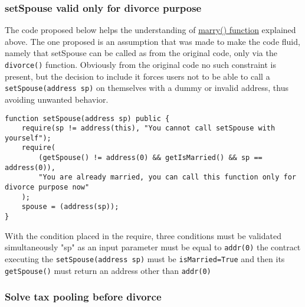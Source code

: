 \documentclass{article}
\begin{document}
\subsubsection{setSpouse valid only for divorce purpose}
\label{sec:setspouse}
The code proposed below helps the understanding of \hyperref[sec:original_marry]{marry() function} explained above.
The one proposed is an assumption that was made to make the code fluid, namely that setSpouse can be called as from the original code, only via the \texttt{divorce()} function. Obviously from the original code no such constraint is present, but the decision to include it forces users not to be able to call a \texttt{setSpouse(address sp)} on themselves with a dummy or invalid address, thus avoiding unwanted behavior.
\begin{verbatim}
function setSpouse(address sp) public {
    require(sp != address(this), "You cannot call setSpouse with yourself");
    require(
        (getSpouse() != address(0) && getIsMarried() && sp == address(0)),
        "You are already married, you can call this function only for divorce purpose now"
    );
    spouse = (address(sp));
}
\end{verbatim}
With the condition placed in the require, three conditions must be validated simultaneously "sp" as an input parameter must be equal to \texttt{addr(0)} the contract executing the \texttt{setSpouse(address sp)}  must be \texttt{isMarried=True} and then its \texttt{getSpouse()} must return an address other than \texttt{addr(0)}
\subsubsection{Solve tax pooling before divorce}
\end{document}
